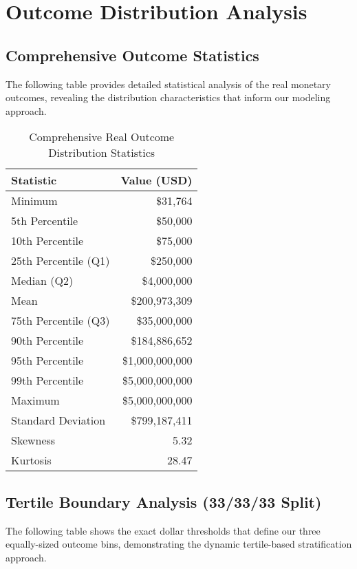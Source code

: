 \documentclass[11pt]{article}
\begin{document}
\section{Outcome Distribution Analysis}

\subsection{Comprehensive Outcome Statistics}

The following table provides detailed statistical analysis of the real monetary outcomes, revealing the distribution characteristics that inform our modeling approach.

\begin{table}[H]
\centering
\caption{Comprehensive Real Outcome Distribution Statistics}
\begin{tabular}{lr}
\toprule
\textbf{Statistic} & \textbf{Value (USD)} \\
\midrule
Minimum & \$31,764 \\
5th Percentile & \$50,000 \\
10th Percentile & \$75,000 \\
25th Percentile (Q1) & \$250,000 \\
Median (Q2) & \$4,000,000 \\
Mean & \$200,973,309 \\
75th Percentile (Q3) & \$35,000,000 \\
90th Percentile & \$184,886,652 \\
95th Percentile & \$1,000,000,000 \\
99th Percentile & \$5,000,000,000 \\
Maximum & \$5,000,000,000 \\
\midrule
Standard Deviation & \$799,187,411 \\
Skewness & 5.32 \\
Kurtosis & 28.47 \\
\bottomrule
\end{tabular}
\end{table}

\subsection{Tertile Boundary Analysis (33/33/33 Split)}

The following table shows the exact dollar thresholds that define our three equally-sized outcome bins, demonstrating the dynamic tertile-based stratification approach.
\end{document}
